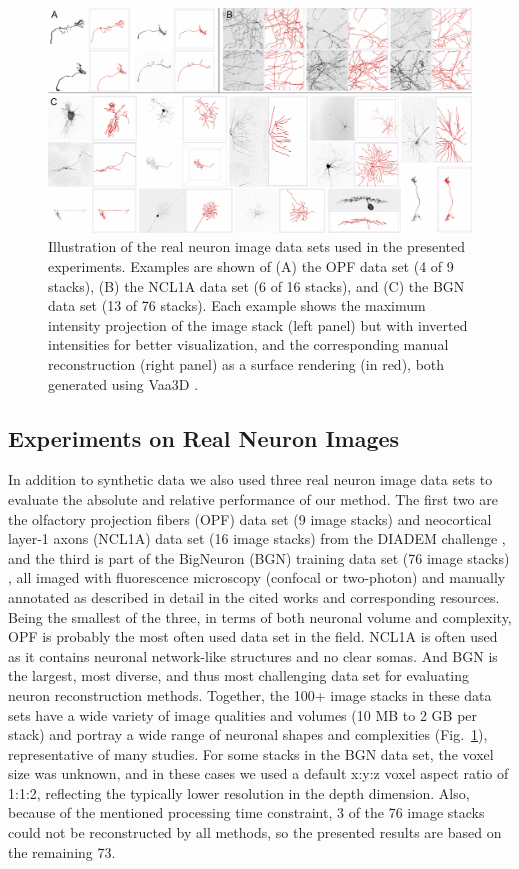\begin{figure}
	\centering
	\includegraphics[width=\textwidth]{fig13}
	\caption{Illustration of the real neuron image data sets used in the presented experiments. Examples are shown of (A) the OPF data set (4 of 9 stacks), (B) the NCL1A data set (6 of 16 stacks), and (C) the BGN data set (13 of 76 stacks). Each example shows the maximum intensity projection of the image stack (left panel) but with inverted intensities for better visualization, and the corresponding manual reconstruction (right panel) as a surface rendering (in red), both generated using Vaa3D \cite{peng2010v3d}.}
	\label{fig13}%
\end{figure}

\subsection{Experiments on Real Neuron Images}
\label{subsec:eval-real}
In addition to synthetic data we also used three real neuron image data sets to evaluate the absolute and relative performance of our method. The first two are the olfactory projection fibers (OPF) data set (9 image stacks) and neocortical layer-1 axons (NCL1A) data set (16 image stacks) from the DIADEM challenge \cite{brown2011diadem}, and the third is part of the BigNeuron (BGN) training data set (76 image stacks) \cite{peng2015bigneuron}, all imaged with fluorescence microscopy (confocal or two-photon) and manually annotated as described in detail in the cited works and corresponding resources. Being the smallest of the three, in terms of both neuronal volume and complexity, OPF is probably the most often used data set in the field. NCL1A is often used as it contains neuronal network-like structures and no clear somas. And BGN is the largest, most diverse, and thus most challenging data set for evaluating neuron reconstruction methods. Together, the 100+ image stacks in these data sets have a wide variety of image qualities and volumes (10 MB to 2 GB per stack) and portray a wide range of neuronal shapes and complexities (Fig.~\ref{fig13}), representative of many studies. For some stacks in the BGN data set, the voxel size was unknown, and in these cases we used a default x:y:z voxel aspect ratio of 1:1:2, reflecting the typically lower resolution in the depth dimension. Also, because of the mentioned processing time constraint, 3 of the 76 image stacks could not be reconstructed by all methods, so the presented results are based on the remaining 73.

